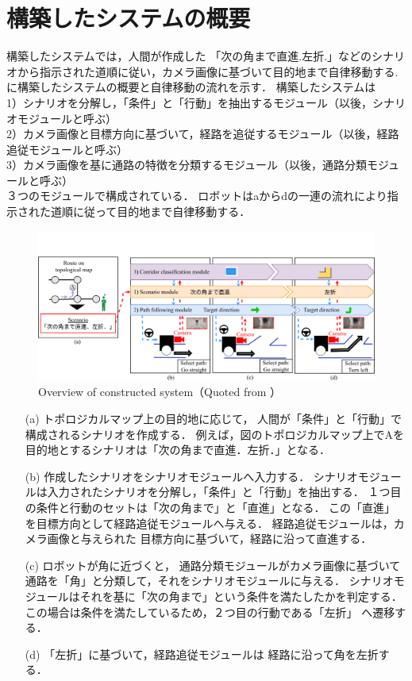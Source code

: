 \section{構築したシステムの概要}
構築したシステムでは，人間が作成した
「次の角まで直進.左折.」などのシナリオから指示された道順に従い，カメラ画像に基づいて目的地まで自律移動する.
に構築したシステムの概要と自律移動の流れを示す．
構築したシステムは\\
1）シナリオを分解し，「条件」と「行動」を抽出するモジュール（以後，シナリオモジュールと呼ぶ）\\
2）カメラ画像と目標方向に基づいて，経路を追従するモジュール（以後，経路追従モジュールと呼ぶ）\\
3）カメラ画像を基に通路の特徴を分類するモジュール（以後，通路分類モジュールと呼ぶ）\\
３つのモジュールで構成されている．
ロボットはaからdの一連の流れにより指示された道順に従って目的地まで自律移動する．
\vspace{3zh}
\begin{figure}[htbp]
    \centering
     \includegraphics[width=130mm]{images/pdf/absv3.pdf}
     \caption[Overview of constructed system]{Overview of constructed system（Quoted from \cite{haruyama2023}）}\label{fig:abs}
\end{figure}
\begin{enumerate}
    \item [(a)] トポロジカルマップ上の目的地に応じて，
    人間が「条件」と「行動」で構成されるシナリオを作成する．
    例えば，図のトポロジカルマップ上でAを目的地とするシナリオは「次の角まで直進．左折．」となる．
    \item [(b)] 作成したシナリオをシナリオモジュールへ入力する．
    シナリオモジュールは入力されたシナリオを分解し，「条件」と「行動」を抽出する．
    １つ目の条件と行動のセットは「次の角まで」と「直進」となる．
    この「直進」を目標方向として経路追従モジュールへ与える．
    経路追従モジュールは，カメラ画像と与えられた
    目標方向に基づいて，経路に沿って直進する．
    \item [(c)] ロボットが角に近づくと，
    通路分類モジュールがカメラ画像に基づいて
    通路を「角」と分類して，それをシナリオモジュールに与える．
    シナリオモジュールはそれを基に「次の角まで」という条件を満たしたかを判定する．
    この場合は条件を満たしているため，２つ目の行動である「左折」
    へ遷移する．
    \item [(d)]「左折」に基づいて，経路追従モジュールは
    経路に沿って角を左折する．
\end{enumerate}


